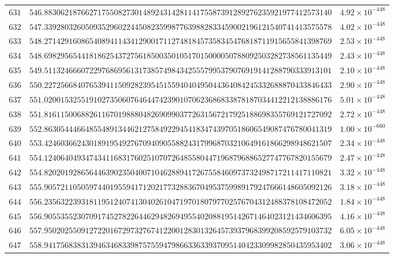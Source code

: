 \documentclass[12pt,reqno]{amsart}
\theoremstyle{remark}
\begin{document}
\begin{longtable}{clc}
$631$ & $546.8830621876627175508273014892431428114175587391289276235921977412573140$ & $4.92\times 10^{-448}$ \\
$632$ & $547.3392803260509352960224450823599877639882833459002196121540741413575578$ & $4.02\times 10^{-448}$ \\
$633$ & $548.2714291608654089411434129001711274818457358345476818711915655841398769$ & $2.53\times 10^{-448}$ \\
$634$ & $548.6982956544181862543727561850035010517015000050788092503282738561135449$ & $2.43\times 10^{-448}$ \\
$635$ & $549.5113246660722976869561317385749843425557995379076919141288790333913101$ & $2.10\times 10^{-448}$ \\
$636$ & $550.2272566840765394115092823954515594040495044364084245332688870433846433$ & $2.90\times 10^{-448}$ \\
$637$ & $551.0200153255191027350607646447423901070623686833878187034412212138886176$ & $5.01\times 10^{-448}$ \\
$638$ & $551.8161150068826116701988804826909903772631567217925188698355769121727092$ & $2.72\times 10^{-448}$ \\
$639$ & $552.8630544466485548913446212758492294541834743970518606549087476780041319$ & $1.00\times 10^{-660}$ \\
$640$ & $553.4246036624301891954927670940905588243179968703210649161866298948621507$ & $2.34\times 10^{-448}$ \\
$641$ & $554.1240640493474341168317602510707264855804471968796886527747767820155679$ & $2.47\times 10^{-448}$ \\
$642$ & $554.8202019286564463902350400710462889417267558460973732498717211417110821$ & $3.32\times 10^{-448}$ \\
$643$ & $555.9057211050597440195594171202177328836704953759989179247666148605092126$ & $3.18\times 10^{-448}$ \\
$644$ & $556.2356322393181195124074130402610471970180797702576704312488378108472052$ & $1.84\times 10^{-448}$ \\
$645$ & $556.9055355230709174527822644629482694955402088195142671464023121434606395$ & $4.16\times 10^{-448}$ \\
$646$ & $557.9502025509127220167297327674122001283013264573937968399208592579103732$ & $6.05\times 10^{-448}$ \\
$647$ & $558.9417568383139463468339875755947986633633937095140423309982850435953402$ & $3.06\times 10^{-448}$ \\

\end{longtable}
\end{document}
